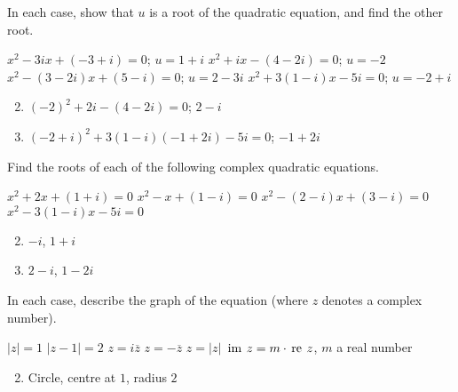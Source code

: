 \begin{multicols}{2}
\columnbreak 
\begin{ex}
In each case, show that $u$ is a root of the quadratic equation, and find the other root.

\begin{exenumerate}
\exitem* $x^{2} - 3ix + (-3 + i) = 0$; $u = 1 + i$
\exitem* $x^{2} + ix - (4 - 2i) = 0$; $u = -2$
\exitem* $x^{2} - (3 - 2i)x + (5 - i) = 0$; $u = 2 - 3i$
\exitem* $x^{2} + 3(1 - i)x - 5i = 0$; $u = -2 + i$
\end{exenumerate}
\begin{sol}
\begin{enumerate}[label={\alph*.}]
\setcounter{enumi}{1}
\item  $(-2)^{2} + 2i - (4 - 2i) = 0$; $2 - i$

\setcounter{enumi}{3}
\item  $(-2 + i)^{2} + 3(1 - i)(-1 + 2i) - 5i = 0$; $-1 + 2i$

\end{enumerate}
\end{sol}
\end{ex}

\begin{ex}
Find the roots of each of the following complex quadratic equations.

\begin{exenumerate}
\exitem $x^{2} + 2x + (1 + i) = 0$
\exitem  $x^{2} - x + (1 - i) = 0$
\exitem* $x^{2} - (2 - i)x + (3 - i) = 0$
\exitem* $x^{2} - 3(1 - i)x - 5i = 0$
\end{exenumerate}
\begin{sol}
\begin{enumerate}[label={\alph*.}]
\setcounter{enumi}{1}
\item  $-i$, $1 + i$

\setcounter{enumi}{3}
\item  $2 - i$, $1 - 2i$

\end{enumerate}
\end{sol}
\end{ex}

\begin{ex}
In each case, describe the graph of the equation (where $z$ denotes a complex number).

\begin{exenumerate}
\exitem $|z| = 1$
\exitem $|z - 1| = 2$
\exitem $z = i \overline{z}$
\exitem $z = -\overline{z}$
\exitem $z = |z|$
\exitem $\thinspace\operatorname{im \medspace}z = m \cdot \thinspace\operatorname{re \medspace}z$, $m$ a real number
\end{exenumerate}
\begin{sol}
\begin{enumerate}[label={\alph*.}]
\setcounter{enumi}{1}
\item  Circle, centre at $1$, radius $2$


\end{enumerate}
\end{sol}
\end{ex}
\end{multicols}
